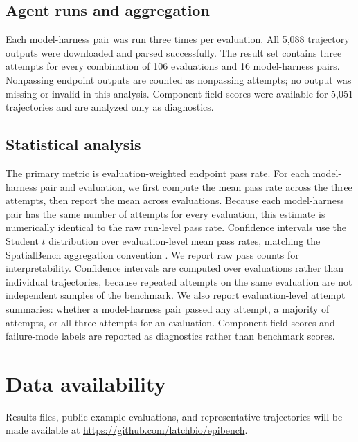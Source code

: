 \documentclass[10pt,letterpaper]{article}
\begin{document}
\subsection{Agent runs and aggregation}

Each model-harness pair was run three times per evaluation. All 5,088
trajectory outputs were downloaded and parsed successfully. The result set
contains three attempts for every combination of 106 evaluations and 16
model-harness pairs. Nonpassing endpoint outputs are counted as nonpassing
attempts; no output was missing or invalid in this analysis. Component field scores were
available for 5,051 trajectories and are analyzed only as diagnostics.

\subsection{Statistical analysis}

The primary metric is evaluation-weighted endpoint pass rate. For each
model-harness pair and evaluation, we first compute the mean pass rate across
the three attempts, then report the mean across evaluations. Because each
model-harness pair has the same number of attempts for every evaluation, this
estimate is numerically identical to the raw run-level pass rate. Confidence
intervals use the Student $t$ distribution
over evaluation-level mean pass rates, matching the SpatialBench aggregation
convention \cite{workman2025spatialbench}. We report raw pass counts for
interpretability. Confidence intervals are computed over evaluations rather
than individual trajectories, because repeated attempts on the same evaluation
are not independent samples of the benchmark. We also report evaluation-level
attempt summaries: whether a model-harness pair passed any attempt, a
majority of attempts, or all three attempts for an evaluation. Component field
scores and failure-mode labels are reported as diagnostics rather than
benchmark scores.

\section*{Data availability}

Results files, public example evaluations, and representative trajectories
will be made available at
\url{https://github.com/latchbio/epibench}.



\EndBody
\end{document}
